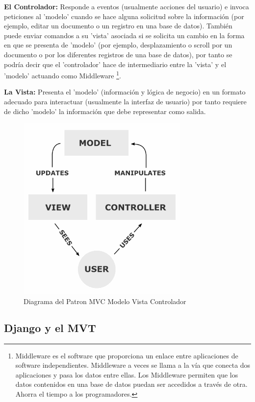 {\bfseries El Controlador: } Responde a eventos (usualmente acciones del
usuario) e invoca peticiones al 'modelo' cuando se hace alguna solicitud sobre
la información (por ejemplo, editar un documento o un registro en una base de
datos). También puede enviar comandos a su 'vista' asociada si se solicita un
cambio en la forma en que se presenta de 'modelo' (por ejemplo, desplazamiento
 o scroll por un documento o por los diferentes registros de una base de datos),
  por tanto se podría decir que el 'controlador' hace de intermediario entre
   la 'vista' y el 'modelo' actuando como Middleware
\footnote{Middleware es el software que proporciona un enlace entre aplicaciones de software
independientes. Middleware a veces se llama a la vía que conecta dos
aplicaciones y pasa los datos entre ellas. Los Middleware permiten que los
datos contenidos en una base de datos puedan ser accedidos a través de otra.
Ahorra el tiempo a los programadores.}.
   
{\bfseries La Vista: } Presenta el 'modelo' (información y lógica de negocio)
 en un formato adecuado para interactuar (usualmente la interfaz de usuario)
 por tanto requiere de dicho 'modelo' la información que debe representar como
 salida.

\begin{figure}[h]
    \centering
    \includegraphics[scale=0.7]{resourse/MVC-Process.png}
    \caption{Diagrama del Patron MVC Modelo Vista Controlador}
    \label{fig:03}
\end{figure}    


\subsection{Django y el MVT}

